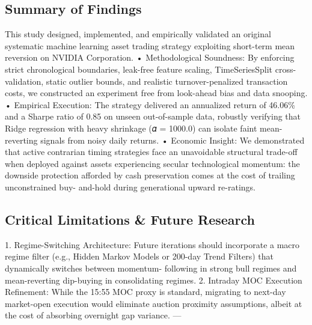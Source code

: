 \documentclass[12pt, a4paper]{article}
\begin{document}
{\subsection{Summary of Findings}
This study designed, implemented, and empirically validated an original systematic machine learning 
asset trading strategy exploiting short-term mean reversion on NVIDIA Corporation.
• Methodological Soundness: By enforcing strict chronological boundaries, leak-free feature scaling, 
TimeSeriesSplit cross-validation, static outlier bounds, and realistic turnover-penalized transaction 
costs, we constructed an experiment free from look-ahead bias and data snooping.
• Empirical Execution: The strategy delivered an annualized return of 46.06\% and a Sharpe ratio of 
0.85 on unseen out-of-sample data, robustly verifying that Ridge regression with heavy shrinkage 
(𝛼 = 1000.0) can isolate faint mean-reverting signals from noisy daily returns.
• Economic Insight:  We demonstrated that active contrarian timing strategies face an unavoidable 
structural trade-off when deployed against assets experiencing secular technological momentum: the 
downside protection afforded by cash preservation comes at the cost of trailing unconstrained buy-
and-hold during generational upward re-ratings.

\subsection{Critical Limitations \& Future Research}
1. Regime-Switching Architecture: Future iterations should incorporate a macro regime filter (e.g., 
Hidden Markov Models or 200-day Trend Filters) that dynamically switches between momentum-
following in strong bull regimes and mean-reverting dip-buying in consolidating regimes.
2. Intraday MOC Execution Refinement:  While the 15:55 MOC proxy is standard, migrating to 
next-day market-open execution would eliminate auction proximity assumptions, albeit at the cost of 
absorbing overnight gap variance.
—

}
\end{document}
